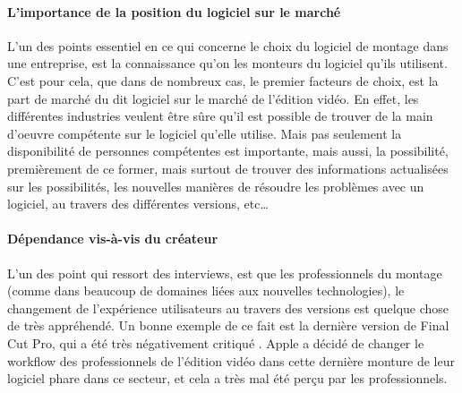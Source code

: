   \paragraph{L'importance de la position du logiciel sur le marché}
  L'un des points essentiel en ce qui concerne le choix du logiciel de montage dans une entreprise,
  est la connaissance qu'on les monteurs du logiciel qu'ils utilisent.
  C'est pour cela, que dans de nombreux cas, le premier facteurs de choix, est la part de marché du dit
  logiciel sur le marché de l'édition vidéo. En effet, les différentes industries veulent être sûre
  qu'il est possible de trouver de la main d'oeuvre compétente sur le logiciel qu'elle utilise. Mais pas
  seulement la disponibilité de personnes compétentes est importante, mais aussi, la possibilité,
  premièrement de ce former, mais surtout de trouver des informations actualisées sur les possibilités,
  les nouvelles manières de résoudre les problèmes avec un logiciel, au travers des différentes versions, etc\ldots

  \paragraph{}

  \paragraph{Dépendance vis-à-vis du créateur}
  L'un des point qui ressort des interviews, est que les professionnels du montage (comme dans
  beaucoup de domaines liées aux nouvelles technologies), le changement de l'expérience utilisateurs au
  travers des versions est quelque chose de très appréhendé. Un bonne exemple de ce fait est la dernière
  version de Final Cut Pro, qui a été très négativement critiqué \cite{FinalCutProXReviews}.
  Apple a décidé de changer le workflow  des professionnels de l'édition vidéo
  dans cette dernière monture de leur logiciel phare dans ce secteur, et cela a très mal été perçu par
  les professionnels.
